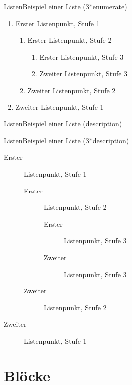 \begin{frame}{Listen}{Beispiel einer Liste (3*enumerate)}
    \begin{enumerate}
        \item Erster Listenpunkt, Stufe 1
        \begin{enumerate}
            \item Erster Listenpunkt, Stufe 2
            \begin{enumerate}
                \item Erster Listenpunkt, Stufe 3
                \item Zweiter Listenpunkt, Stufe 3
            \end{enumerate}
            \item Zweiter Listenpunkt, Stufe 2
        \end{enumerate}
        \item Zweiter Listenpunkt, Stufe 1
    \end{enumerate}
\end{frame}

\begin{frame}{Listen}{Beispiel einer Liste (description)}
    \blinddescription
\end{frame}

\begin{frame}{Listen}{Beispiel einer Liste (3*description)}
    \begin{description}
        \item[Erster] Listenpunkt, Stufe 1
        \begin{description}
            \item[Erster] Listenpunkt, Stufe 2
            \begin{description}
                \item[Erster] Listenpunkt, Stufe 3
                \item[Zweiter] Listenpunkt, Stufe 3
            \end{description}
            \item[Zweiter] Listenpunkt, Stufe 2
        \end{description}
        \item[Zweiter] Listenpunkt, Stufe 1
    \end{description}
\end{frame}


\section{Blöcke} %

